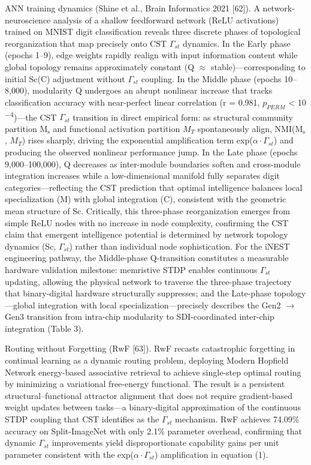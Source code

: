 \documentclass[a4paper,12pt]{article}
\providecommand{\textsubscript}[1]{\ensuremath{_{\text{#1}}}}
\begin{document}
ANN training dynamics (Shine et al., Brain Informatics 2021 [62]).
A network-neuroscience analysis of a shallow feedforward network (ReLU activations) trained on MNIST digit classification reveals three discrete phases of topological reorganization that map precisely onto CST $\Gamma_{st}$ dynamics.
In the Early phase (epochs 1--9), edge weights rapidly realign with input information content while global topology remains approximately constant (Q  $\approx$  stable)---corresponding to initial Sc(C) adjustment without $\Gamma_{st}$ coupling.
In the Middle phase (epochs 10--8,000), modularity Q undergoes an abrupt nonlinear increase that tracks classification accuracy with near-perfect linear correlation (r = 0.981, $p_{PERM}$ < 10\textsuperscript{$-$}\textsuperscript{4})---the CST $\Gamma_{st}$ transition in direct empirical form: as structural community partition M\textsubscript{s} and functional activation partition $M_{T}$ spontaneously align, NMI(M\textsubscript{s}, $M_{T}$) rises sharply, driving
the exponential amplification term exp($\alpha \cdot \Gamma_{st}$) and producing the observed nonlinear performance jump.
In the Late phase (epochs 9,000--100,000), Q decreases as inter-module boundaries soften and cross-module integration increases while a low-dimensional manifold fully separates digit categories---reflecting the CST prediction that optimal intelligence balances local specialization (M) with global integration (C), consistent with the geometric mean structure of Sc.
Critically, this three-phase reorganization emerges from simple ReLU nodes with no increase in node complexity, confirming the CST claim that emergent intelligence potential is determined by network topology dynamics (Sc, $\Gamma_{st}$) rather than individual node sophistication.
For the iNEST engineering pathway, the Middle-phase Q-transition constitutes a measurable hardware validation milestone: memristive STDP enables continuous $\Gamma_{st}$ updating, allowing the physical network to traverse the three-phase trajectory that binary-digital hardware structurally suppresses; and the Late-phase topology---global integration with local specialization---precisely describes
the Gen2 $\rightarrow$ Gen3 transition from intra-chip modularity to SDI-coordinated inter-chip integration (Table 3).

Routing without Forgetting (RwF [63]).
RwF recasts catastrophic forgetting in continual learning as a dynamic routing problem, deploying Modern Hopfield Network energy-based associative retrieval to achieve single-step optimal routing by minimizing a variational free-energy functional.
The result is a persistent structural--functional attractor alignment that does not require gradient-based weight updates between tasks---a binary-digital approximation of the continuous STDP coupling that CST identifies as the $\Gamma_{st}$ mechanism.
RwF achieves 74.09\% accuracy on Split-ImageNet with only 2.1\% parameter overhead, confirming that dynamic $\Gamma_{st}$ improvements yield disproportionate capability gains per unit parameter consistent with the exp($\alpha \cdot \Gamma_{st}$) amplification in equation (1).
\end{document}
